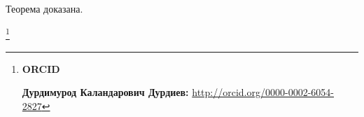 Теорема доказана.









\smallskip









\thanks{{\bf ORCID}



{\bf Дурдимурод Каландарович Дурдиев:} \url{http://orcid.org/0000-0002-6054-2827}





}





\newpage



\RusRef




